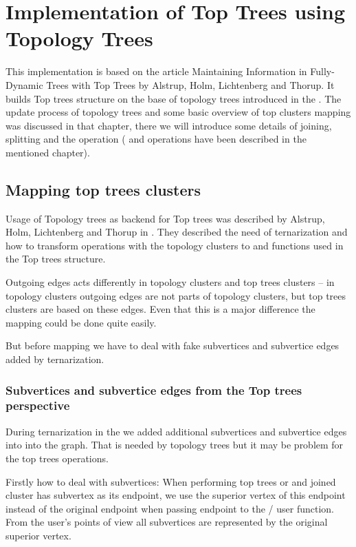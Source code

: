 \chapter{Implementation of Top Trees using Topology Trees}
\label{chap:ImplementationTopology}

This implementation is based on the article {\I Maintaining Information in
Fully-Dynamic Trees with Top Trees} \cite{TopTrees} by Alstrup, Holm,
Lichtenberg and Thorup. It builds Top trees structure on the base of topology
trees introduced in the . The update process of
topology trees and some basic overview of top clusters mapping was discussed in
that chapter, there we will introduce some details of joining, splitting and the
\Expose{} operation (\Link{} and \Cut{} operations have been described in the
mentioned chapter).

\section{Mapping top trees clusters}

Usage of Topology trees as backend for Top trees was described by Alstrup, Holm,
Lichtenberg and Thorup in \cite{TopTrees}. They described the need of
ternarization and how to transform operations with the topology clusters to
\Split{} and \Join{} functions used in the Top trees structure.

Outgoing edges acts differently in topology clusters and top trees clusters --
in topology clusters outgoing edges are not parts of topology clusters, but
top trees clusters are based on these edges. Even that this is a major
difference the mapping could be done quite easily.

But before mapping we have to deal with fake subvertices and subvertice edges
added by ternarization.

\subsection{Subvertices and subvertice edges from the Top trees perspective}

During ternarization in the  we added additional
subvertices and subvertice edges into into the graph. That is needed by topology
trees but it may be problem for the top trees operations.

Firstly how to deal with subvertices: When performing top trees \Join{} or
\Split{} and joined cluster has subvertex as its endpoint, we use the superior
vertex of this endpoint instead of the original endpoint when passing endpoint
to the \Join/\Split{} user function. From the user's points of view all
subvertices are represented by the original superior vertex.

